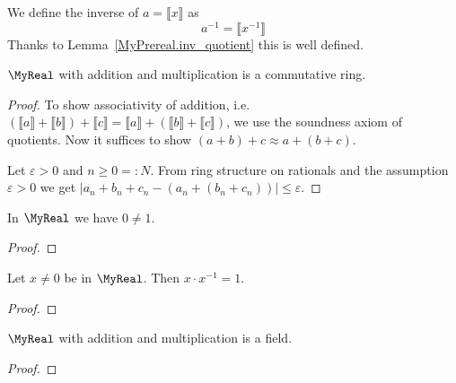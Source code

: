 \begin{definition}
    \label{MyReal.inv}
    \leanok
We define the inverse of $a = ⟦ x ⟧$ as
\[
a^{-1} = ⟦ x^{-1} ⟧
\]
Thanks to Lemma~\ref{MyPrereal.inv_quotient} this is well defined.
\end{definition}

\begin{proposition}
    \label{MyReal.commRing}
    \leanok
    $\MyReal$ with addition and multiplication is a commutative ring.
\end{proposition}
\begin{proof}
    \leanok
    To show associativity of addition, i.e. $(⟦ a ⟧ + ⟦ b ⟧) + ⟦ c ⟧ = ⟦ a ⟧ + (⟦ b ⟧ + ⟦ c ⟧)$, we use the soundness axiom of quotients.
    Now it suffices to show $(a + b) + c \approx a + (b + c)$.

    Let $\varepsilon > 0$ and $n \geq 0 =: N$.
    From ring structure on rationals and the assumption $\varepsilon > 0$ we get $|a_n + b_n + c_n - (a_n + (b_n + c_n))| \leq \varepsilon$.
\end{proof}

\begin{lemma}
    \label{MyReal.zero_ne_one}
    \leanok
In $\MyReal$ we have $0 \neq 1$.
\end{lemma}
\begin{proof}
    \leanok
\end{proof}

\begin{lemma}
    \label{MyReal.mul_inv_cancel}
    \leanok
Let $x \neq 0$ be in $\MyReal$. Then $x \cdot x^{-1} = 1$.
\end{lemma}
\begin{proof}
    \leanok
\end{proof}

\begin{proposition}[Field]
    \label{MyReal.field}
    \leanok
    $\MyReal$ with addition and multiplication is a field.
\end{proposition}
\begin{proof}
    \leanok
\end{proof}

